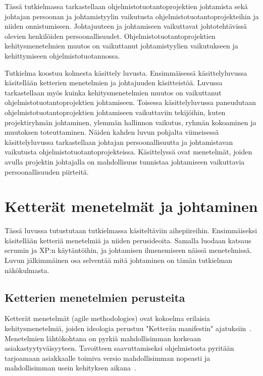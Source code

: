 \documentclass[finnish]{tktltiki2}
\theoremstyle{definition}
\theoremstyle{remark}
\begin{document}
Tässä tutkielmassa tarkastellaan ohjelmistotuotantoprojektien johtamista sekä johtajan persoonan ja johtamistyylin vaikutusta ohjelmistotuotantoprojekteihin ja niiden onnistumiseen. Johtajuuteen ja johtamiseen vaikuttavat johtotehtävissä olevien henkilöiden persoonallisuudet. Ohjelmistotuotantoprojektien kehitysmenetelmien muutos on vaikuttanut johtamistyylien vaikutukseen ja kehittymiseen ohjelmistotuotannossa. 

Tutkielma koostuu kolmesta käsittely luvusta. Ensimmäisessä käsittelyluvussa käsitellään ketterien menetelmien ja johtajuuden käsitteistöä. Luvussa tarkastellaan myös kuinka kehitysmenetelmien muutos on vaikuttanut ohjelmistotuotantoprojektien johtamiseen. Toisessa käsittelyluvussa paneudutaan ohjelmistotuotantoprojektien johtamiseen vaikuttaviin tekijöihin, kuten projektiryhmän johtaminen, ylemmän hallinnon vaikutus, ryhmän kokoaminen ja muutoksen toteuttaminen. Näiden kahden luvun pohjalta viimeisessä  käsittelyluvussa tarkastellaan johtajan persoonallisuutta ja johtamistavan vaikutusta ohjelmistotuotantoprojekteissa. Käsittelyssä ovat menetelmät, joiden avulla projektin johtajalla on mahdollisuus tunnistaa johtamiseen vaikuttavia persoonallisuuden piirteitä.


\section{Ketterät menetelmät ja johtaminen}

Tässä luvussa tutustutaan tutkielmassa käsiteltäviin aihepiireihin. En\-sim\-mäi\-sek\-si käsitellään ketteriä menetelmiä ja niiden perusideoita. Samalla luodaan katsaus scrumin ja XP:n käytäntöihin, ja johtamisen ilmenemiseen näissä menetelmissä.  Luvun jälkimmäinen osa selventää mitä johtaminen on tämän tutkielman näkökulmasta.  


\subsection{Ketterien menetelmien perusteita}

Ketterät menetelmät (agile methodologies) ovat kokoelma erilaisia kehitysmenetelmiä, joiden ideologia perustuu "Ketterän manifestin" ajatuksiin~\cite{fowler2001agile}. Menetelmien lähtökohtana on pyrkiä mahdollisimman korkeaan asiakastyytyväisyyteen. Tavoitteen saavuttamiseksi ohjelmistosta pyritään tarjoamaan asiakkaalle toimiva versio mahdollisimman nopeasti ja mahdollisimman usein kehityksen aikana~\cite{fowler2001agile}.
\end{document}
